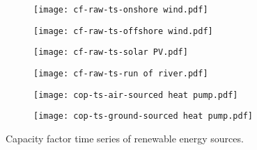 \begin{figure}
    \centering
        \begin{subfigure}[t]{0.49\textwidth}
            \centering
        \texttt{[image: cf-raw-ts-onshore wind.pdf]}
    \end{subfigure}
    \begin{subfigure}[t]{0.49\textwidth}
        \centering
        \texttt{[image: cf-raw-ts-offshore wind.pdf]}
    \end{subfigure}
    \begin{subfigure}[t]{0.49\textwidth}
        \centering
        \texttt{[image: cf-raw-ts-solar PV.pdf]}
    \end{subfigure}
    \begin{subfigure}[t]{0.49\textwidth}
        \centering
        \texttt{[image: cf-raw-ts-run of river.pdf]}
    \end{subfigure}
    \begin{subfigure}[t]{0.49\textwidth}
        \centering
        \texttt{[image: cop-ts-air-sourced heat pump.pdf]}
    \end{subfigure}
    \begin{subfigure}[t]{0.49\textwidth}
        \centering
        \texttt{[image: cop-ts-ground-sourced heat pump.pdf]}
    \end{subfigure}
    \caption{Capacity factor time series of renewable energy sources.}
    \label{fig:cfs-ts}
\end{figure}

